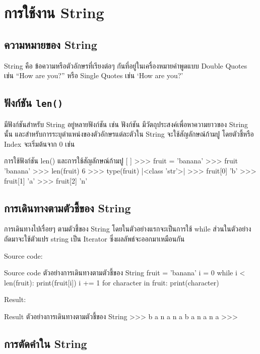 \chapter{การใช้งาน String}
\section{ความหมายของ String}

String คือ ข้อความหรือตัวอักษรที่เรียงต่อๆ กันที่อยู่ในเครื่องหมายคำพูดแบบ Double Quotes เช่น “How are you?” หรือ Single Quotes เช่น ‘How are you?’ 

\section{ฟังก์ชัน \texttt{len()}}

มีฟังก์ชันสำหรับ String อยู่หลายฟังก์ชัน เช่น ฟังก์ชัน  มีวัตถุประสงค์เพื่อหาความยาวของ String นั้น และสำหรับการระบุตำแหน่งของตัวอักษรแต่ละตัวใน String จะใช้สัญลักษณ์ก้ามปู \pyinline{[ ]} โดยตัวชี้หรือ Index จะเริ่มต้นจาก 0 เช่น 

\begin{codelist}{การใช้ฟังก์ชัน len() และการใช้สัญลักษณ์ก้ามปู [ ]}{}
>>> fruit = 'banana'
>>> fruit
'banana'
>>> len(fruit)
6
>>> type(fruit)
|<class \rq{}str\rq{}>|
>>> fruit[0]
'b'
>>> fruit[1]
'a'
>>> fruit[2]
'n'
\end{codelist}


\section{การเดินทางตามตัวชี้ของ String}

การเดินทางไปเรื่อยๆ ตามตัวชี้ของ String โดยในตัวอย่างแรกจะเป็นการใช้ while ส่วนในตัวอย่างถัดมาจะใช้ตัวแปร string เป็น Iterator ซึ่งผลลัพธ์จะออกมาเหมือนกัน

Source code:
\begin{codelist}{Source code ตัวอย่างการเดินทางตามตัวชี้ของ String}{}
fruit = 'banana'
i = 0
while i < len(fruit):
    print(fruit[i])
    i += 1
for character in fruit: print(character)
\end{codelist}

Result:
\begin{codelist}{Result ตัวอย่างการเดินทางตามตัวชี้ของ String}{}
>>>
b
a
n
a
n
a
b
a
n
a
n
a
>>>
\end{codelist}



\section{การตัดคำใน String}

